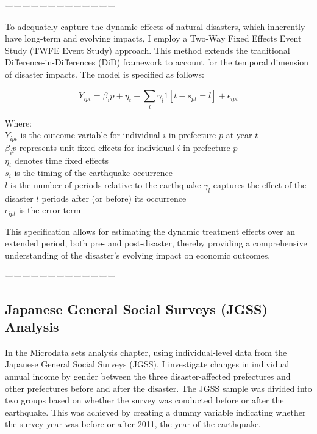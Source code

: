 \documentclass[a4paper,12pt]{article}
\begin{document}
ーーーーーーーーーーーーー

To adequately capture the dynamic effects of natural disasters, which inherently have long-term and evolving impacts, I employ a Two-Way Fixed Effects Event Study (TWFE Event Study) approach. This method extends the traditional Difference-in-Differences (DiD) framework to account for the temporal dimension of disaster impacts. The model is specified as follows:

\begin{equation}
Y_{ipt} = \beta_ip + \eta_t + \sum_{l}^{} \gamma_l 1 [t-s_{pt} = l] + \epsilon_{ipt}
\end{equation}

Where: \\
$Y_{ipt}$ is the outcome variable for individual \( i \) in prefecture \( p \) at year \( t \) \\
$\beta_ip$ represents unit fixed effects for individual \( i \) in prefecture \( p \) \\
$\eta_t$ denotes time fixed effects \\
$s_{i}$ is the timing of the earthquake occurrence \\
$l$ is the number of periods relative to the earthquake
$\gamma_l$ captures the effect of the disaster $l$ periods after (or before) its occurrence \\
$\epsilon_{ipt}$ is the error term

This specification allows for estimating the dynamic treatment effects over an extended period, both pre- and post-disaster, thereby providing a comprehensive understanding of the disaster's evolving impact on economic outcomes.

ーーーーーーーーーーーーー



\subsection{Japanese General Social Surveys (JGSS) Analysis}

In the Microdata sets analysis chapter, using individual-level data from the Japanese General Social Surveys (JGSS), I investigate changes in individual annual income by gender between the three disaster-affected prefectures and other prefectures before and after the disaster. The JGSS sample was divided into two groups based on whether the survey was conducted before or after the earthquake. This was achieved by creating a dummy variable indicating whether the survey year was before or after 2011, the year of the earthquake.
\end{document}
